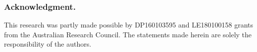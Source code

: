 \documentclass[runningheads]{llncs}
\begin{document}
\subsubsection*{Acknowledgment.}
This research was partly made possible by DP160103595 and LE180100158 grants from the Australian Research Council. The statements made herein are solely the responsibility of the authors.

%
%
%
\vspace{-0.4 cm}



\vspace{-0.4 cm}
%
\end{document}
